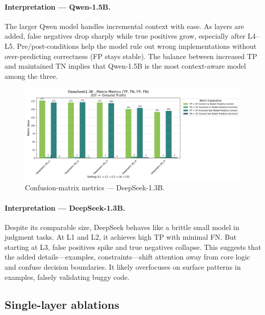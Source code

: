 \documentclass[a4paper]{usiinfbachelorproject}
\begin{document}
\paragraph*{Interpretation — Qwen-1.5B.}
The larger Qwen model handles incremental context with ease. As layers are added, false negatives drop sharply while true positives grow, especially after L4–L5. Pre/post-conditions help the model rule out wrong implementations without over-predicting correctness (FP stays stable). The balance between increased TP and maintained TN implies that Qwen-1.5B is the most context-aware model among the three.

\vspace{0.8em}

\begin{figure}[H]\centering
  \includegraphics[width=\linewidth]{figures/DeepSeek1.3B_matrix_metrics.png}
  \caption{Confusion-matrix metrics — DeepSeek-1.3B.}
  \label{fig:ds-matrix}
\end{figure}

\paragraph*{Interpretation — DeepSeek-1.3B.}
Despite its comparable size, DeepSeek behaves like a brittle small model in judgment tasks. At L1 and L2, it achieves high TP with minimal FN. But starting at L3, false positives spike and true negatives collapse. This suggests that the added details—examples, constraints—shift attention away from core logic and confuse decision boundaries. It likely overfocuses on surface patterns in examples, falsely validating buggy code.



\subsection{Single-layer ablations}
\end{document}
